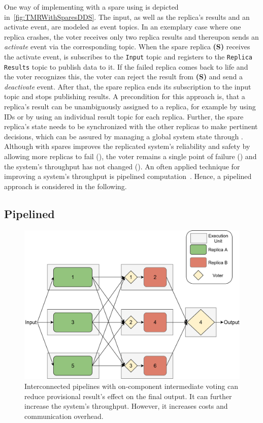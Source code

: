 One way of implementing  with a spare using  is depicted in~\autoref{fig:TMRWithSparesDDS}.
The input, as well as the replica's results and an activate event, are modeled as  event topics.
In an exemplary case where one replica crashes, the voter receives only two replica results and thereupon sends an \textit{activate} event via the corresponding topic.
When the spare replica \textbf{(S)} receives the activate event, is subscribes to the \texttt{Input} topic and registers to the \texttt{Replica Results} topic to publish data to it.
If the failed replica comes back to life and the voter recognizes this, the voter can reject the result from \textbf{(S)} and send a \textit{deactivate} event.
After that, the spare replica ends its subscription to the input topic and stops publishing results.
A precondition for this approach is, that a replica's result can be unambiguously assigned to a replica, for example by using IDs or by using an individual result topic for each replica.
Further, the spare replica's state needs to be synchronized with the other replicas to make pertinent decisions, which can be assured by managing a global system state through .
\\

Although  with spares improves the replicated system's reliability and safety by allowing more replicas to fail (\ChallengeWR), the voter remains a single point of failure (\ChallengeVoter) and the system's throughput has not changed (\ChallengeThrough).
An often applied technique for improving a system's throughput is pipelined computation~\cite{TanenbaumSteen07}.
Hence, a pipelined  approach is considered in the following.

\subsection{Pipelined }
\begin{figure}[!hb]
	\centering
	\includegraphics[width=0.9\linewidth]{images/InterconnectedVoterPipeline}
	\caption{Interconnected pipelines with on-component intermediate voting can reduce provisional result's effect on the final output. It can further increase the system's throughput. However, it increases costs and communication overhead.}
	\label{fig:PipelineIntermediateVoters}
\end{figure}

